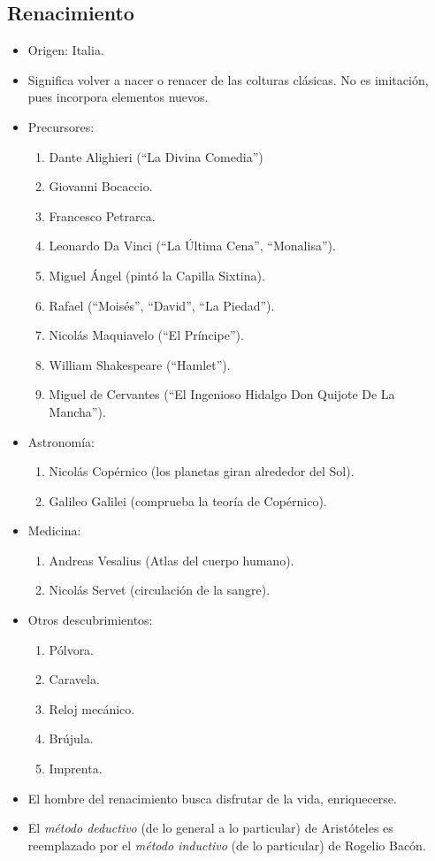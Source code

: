 \subsection{Renacimiento}

\begin{itemize}

\item Origen: Italia.

\item Significa volver a nacer o renacer de las colturas clásicas.
No es imitación, pues incorpora elementos nuevos.

\item Precursores:
\begin{enumerate}
	\item Dante Alighieri (``La Divina Comedia'')
	\item Giovanni Bocaccio.
	\item Francesco Petrarca.
	\item Leonardo Da Vinci (``La Última Cena'', ``Monalisa'').
	\item Miguel Ángel (pintó la Capilla Sixtina).
	\item Rafael (``Moisés'', ``David'', ``La Piedad'').
	\item Nicolás Maquiavelo (``El Príncipe'').
	\item William Shakespeare (``Hamlet'').
	\item Miguel de Cervantes (``El Ingenioso Hidalgo Don Quijote De La Mancha'').
\end{enumerate}

\item Astronomía:
\begin{enumerate}
	\item Nicolás Copérnico (los planetas giran alrededor del Sol).
	\item Galileo Galilei (comprueba la teoría de Copérnico).
\end{enumerate}

\item Medicina:
\begin{enumerate}
	\item Andreas Vesalius (Atlas del cuerpo humano).
	\item Nicolás Servet (circulación de la sangre).
\end{enumerate}

\item Otros descubrimientos:
\begin{enumerate}
	\item Pólvora.
	\item Caravela.
	\item Reloj mecánico.
	\item Brújula.
	\item Imprenta.
\end{enumerate}

\item El hombre del renacimiento busca disfrutar de la vida, enriquecerse.

\item El \emph{método deductivo} (de lo general a lo particular) de Aristóteles es reemplazado por el \emph{método inductivo} (de lo particular) de Rogelio Bacón.

\end{itemize}